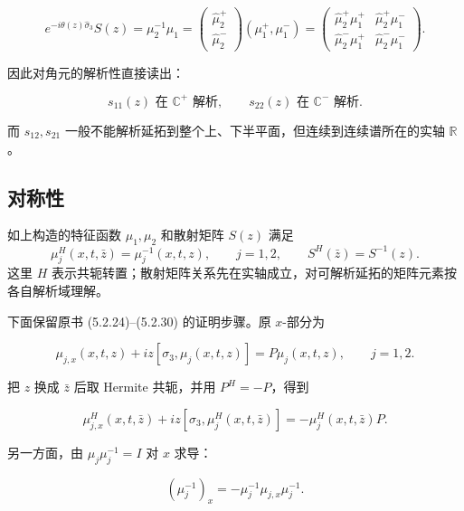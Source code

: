 \documentclass[
    lang=cn,
    scheme=chinese,
    mode=simple,
    device=normal,
    color=blue,
    math=cm,
    thmcnt=section,
    12pt
]{elegantbook}
\begin{document}
\[
    e^{-i\theta(z)\widehat{\sigma}_3}S(z)
    =
    \mu_2^{-1}\mu_1
    =
    \begin{pmatrix}
        \widehat\mu_2^+ \\
        \widehat\mu_2^-
    \end{pmatrix}
    (\mu_1^+,\mu_1^-)
    =
    \begin{pmatrix}
        \widehat\mu_2^+\mu_1^+ & \widehat\mu_2^+\mu_1^- \\
        \widehat\mu_2^-\mu_1^+ & \widehat\mu_2^-\mu_1^-
    \end{pmatrix}.
\]

因此对角元的解析性直接读出：

\[
    s_{11}(z)\text{ 在 }\mathbb{C}^+\text{ 解析},
    \qquad
    s_{22}(z)\text{ 在 }\mathbb{C}^-\text{ 解析}.
\]

而 $s_{12},s_{21}$ 一般不能解析延拓到整个上、下半平面，但连续到连续谱所在的实轴 $\mathbb{R}$。

\subsection{对称性}

\setcounter{theorem}{0}
\begin{theorem}[特征函数与散射矩阵的共轭对称]
如上构造的特征函数 $\mu_1,\mu_2$ 和散射矩阵 $S(z)$ 满足
\[
\mu_j^H(x,t,\bar z)=\mu_j^{-1}(x,t,z),\qquad j=1,2,\qquad S^H(\bar z)=S^{-1}(z).
\]
这里 $H$ 表示共轭转置；散射矩阵关系先在实轴成立，对可解析延拓的矩阵元素按各自解析域理解。
\end{theorem}

下面保留原书 (5.2.24)--(5.2.30) 的证明步骤。原 $x$-部分为

\begin{equation}
    \mu_{j,x}(x,t,z)
    +
    iz[\sigma_3,\mu_j(x,t,z)]
    =
    P\mu_j(x,t,z),
    \qquad j=1,2.
    \tag{5.2.24}
    \label{eq:5.2.24}
\end{equation}

把 $z$ 换成 $\bar z$ 后取 Hermite 共轭，并用 $P^H=-P$，得到

\begin{equation}
    \mu_{j,x}^H(x,t,\bar z)
    +
    iz[\sigma_3,\mu_j^H(x,t,\bar z)]
    =
    -\mu_j^H(x,t,\bar z)P.
    \tag{5.2.25}
    \label{eq:5.2.25}
\end{equation}

另一方面，由 $\mu_j\mu_j^{-1}=I$ 对 $x$ 求导：

\begin{equation}
    (\mu_j^{-1})_x
    =
    -\mu_j^{-1}\mu_{j,x}\mu_j^{-1}.
    \tag{5.2.26}
    \label{eq:5.2.26}
\end{equation}
\end{document}

